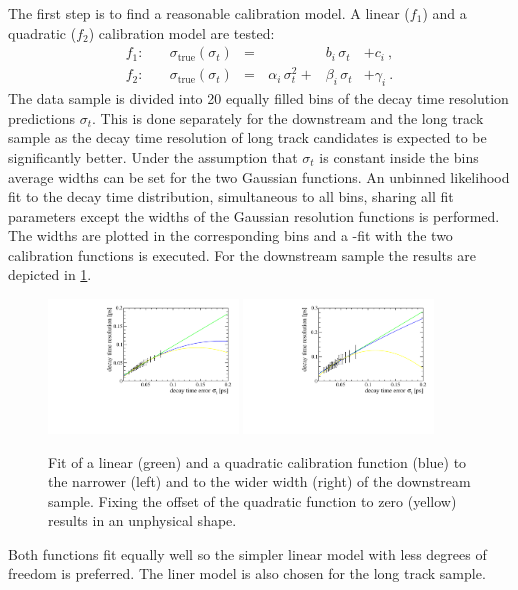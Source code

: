 The first step is to find a reasonable calibration model. A linear ($f_1$) and
a quadratic ($f_2$) calibration model are tested:
\begin{equation}
\begin{aligned}
f_1:&\quad \sigma_{\text{true}}(\sigma_t) &=&  &b_i\,\sigma_t &+ c_i \ , \\
f_2:&\quad \sigma_{\text{true}}(\sigma_t) &=&\, \alpha_i\,\sigma_t^2 + &\beta_i\,\sigma_t &+ \gamma_i \ .
\end{aligned}
\label{eq:resolutioncalibfunctions}
\end{equation}
%
The data sample is divided into \num{20} equally filled bins of the decay time
resolution predictions $\sigma_t$. This is done separately for the downstream
and the long track sample as the decay time resolution of long track
candidates is expected to be significantly better. Under the assumption that
$\sigma_t$ is constant inside the bins average widths can be set for the two
Gaussian functions. An unbinned likelihood fit to the decay time distribution,
simultaneous to all bins, sharing all fit parameters except the widths of the
Gaussian resolution functions is performed. The widths are plotted in the
corresponding bins and a \chisq-fit with the two calibration functions is
executed. For the downstream sample the results are depicted in
\cref{fig:CalibrationOffsetResolution_DD}. 
%
\begin{figure}[!htb]
\centering
  \includegraphics[width=0.45\textwidth]{06-Bd2JpsiKS/figs/ResolutionCalibration_1_DD.pdf}
  \includegraphics[width=0.45\textwidth]{06-Bd2JpsiKS/figs/ResolutionCalibration_2_DD.pdf}
\caption{Fit of a linear (green) and a quadratic calibration function (blue)
to the narrower (left) and to the wider width (right) of the downstream
sample. Fixing the offset of the quadratic function to zero (yellow) results
in an unphysical shape.}
\label{fig:CalibrationOffsetResolution_DD}
\end{figure}
%
Both functions fit equally well so the simpler linear model with less degrees
of freedom is preferred. The liner model is also chosen for the long track
sample.

